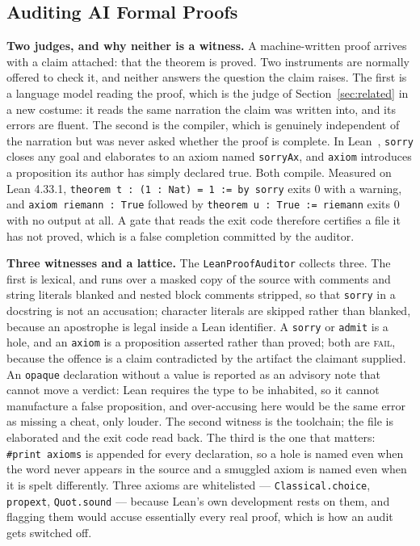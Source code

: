 \documentclass[conference]{IEEEtran}
\begin{document}
\subsection{Auditing AI Formal Proofs}
\label{sec:lean}

\textbf{Two judges, and why neither is a witness.}
A machine-written proof arrives with a claim attached: that the theorem is
proved. Two instruments are normally offered to check it, and neither answers the
question the claim raises. The first is a language model reading the proof, which
is the judge of Section~\ref{sec:related} in a new costume: it reads the same
narration the claim was written into, and its errors are fluent. The second is
the compiler, which is genuinely independent of the narration but was never asked
whether the proof is complete. In Lean~\cite{demoura2021lean4}, \texttt{sorry}
closes any goal and elaborates to an axiom named \texttt{sorryAx}, and
\texttt{axiom} introduces a proposition its author has simply declared true. Both
compile. Measured on Lean 4.33.1,
\texttt{theorem t : (1 : Nat) = 1 := by sorry} exits $0$ with a warning, and
\texttt{axiom riemann : True} followed by
\texttt{theorem u : True := riemann} exits $0$ with no output at all. A gate that
reads the exit code therefore certifies a file it has not proved, which is a
false completion committed by the auditor.

\textbf{Three witnesses and a lattice.}
The \texttt{LeanProofAuditor} collects three. The first is lexical, and runs over
a masked copy of the source with comments and string literals blanked and nested
block comments stripped, so that \texttt{sorry} in a docstring is not an
accusation; character literals are skipped rather than blanked, because an
apostrophe is legal inside a Lean identifier. A \texttt{sorry} or \texttt{admit}
is a hole, and an \texttt{axiom} is a proposition asserted rather than proved;
both are \textsc{fail}, because the offence is a claim contradicted by the
artifact the claimant supplied. An \texttt{opaque} declaration without a value is
reported as an advisory note that cannot move a verdict: Lean requires the type
to be inhabited, so it cannot manufacture a false proposition, and over-accusing
here would be the same error as missing a cheat, only louder. The second witness
is the toolchain; the file is elaborated and the exit code read back. The third
is the one that matters: \texttt{\#print axioms} is appended for every
declaration, so a hole is named even when the word never appears in the source
and a smuggled axiom is named even when it is spelt differently. Three axioms are
whitelisted --- \texttt{Classical.choice}, \texttt{propext},
\texttt{Quot.sound} --- because Lean's own development rests on them, and
flagging them would accuse essentially every real proof, which is how an audit
gets switched off.
\end{document}
